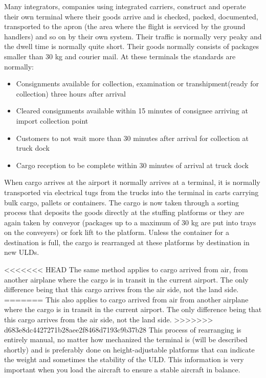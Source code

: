 Many integrators, companies using integrated carriers, construct and operate their own terminal where their goods arrive and is checked, packed, documented, transported to the apron (the area where the flight is serviced by the ground handlers) and so on by their own system. 
Their traffic is normally very peaky and the dwell time is normally quite short. Their goods normally consists of packages smaller than 30 kg and courier mail. At these terminals the standards are normally:
\begin{itemize}
\item Consignments available for collection, examination or transhipment(ready for collection) three hours after arrival
\item Cleared consignments available within 15 minutes of consignee arriving at import collection point
\item Customers to not wait more than 30 minutes after arrival for collection at truck dock
\item Cargo reception to be complete within 30 minutes of arrival at truck dock
\end{itemize}

When cargo arrives at the airport it normally arrives at a terminal, it is normally transported via electrical tugs from the trucks into the terminal in carts carrying bulk cargo, pallets or containers. The cargo is now taken through a sorting process that deposits the goods directly at the stuffing platforms or they are again taken by conveyor (packages up to a maximum of 30 kg are put into trays on the conveyers) or fork lift to the platform.
Unless the container for a destination is full, the cargo is rearranged at these platforms by destination in new ULDs.


<<<<<<< HEAD
The same method applies to cargo arrived from air, from another airplane where the cargo is in transit in the current airport. The only difference being that this cargo arrives from the air side, not the land side.
=======
This also applies to cargo arrived from air from another airplane where the cargo is in transit in the current airport. The only difference being that this cargo arrives from the air side, not the land side.
>>>>>>> d683e8dc4427271b28aee2f8468d7193c9b37b28
This process of rearranging is entirely manual, no matter how mechanized the terminal is (will be described shortly) and is preferably done on height-adjustable platforms that can indicate the weight and sometimes the stability of the ULD. This information is very important when you load the aircraft to ensure a stable aircraft in balance.


